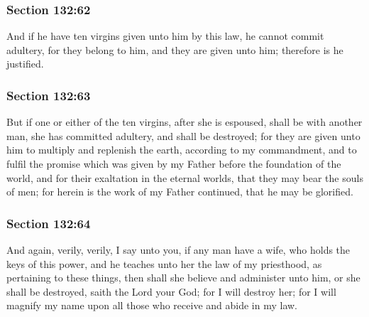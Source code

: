 	\subsubsection{Section 132:62} %
		\label{DC132-62}

		And if he have ten virgins given unto him by this law, he cannot commit adultery, for they belong to him, and they are given unto him; therefore is he justified.


	\subsubsection{Section 132:63} %
		\label{DC132-63}

		But if one or either of the ten virgins, after she is espoused, shall be with another man, she has committed adultery, and shall be destroyed; for they are given unto him to multiply and replenish the earth, according to my commandment, and to fulfil the promise which was given by my Father before the foundation of the world, and for their exaltation in the eternal worlds, that they may bear the souls of men; for herein is the work of my Father continued, that he may be glorified.


	\subsubsection{Section 132:64} %
		\label{DC132-64}

		And again, verily, verily, I say unto you, if any man have a wife, who holds the keys of this power, and he teaches unto her the law of my priesthood, as pertaining to these things, then shall she believe and administer unto him, or she shall be destroyed, saith the Lord your God; for I will destroy her; for I will magnify my name upon all those who receive and abide in my law.

